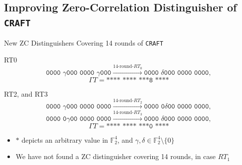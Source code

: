\documentclass{beamer}
\begin{document}
\subsection{Improving Zero-Correlation Distinguisher of \texttt{CRAFT}}
\begin{frame}{New ZC Distinguishers Covering 14 rounds of \texttt{CRAFT}}
\begin{block}{RT0}
\[\texttt{0000~$\gamma$000~0000~$\gamma$000} \xrightarrow{\text{14-round-$RT_0$}} \texttt{0000~$\delta$000~0000~0000},\]
\[\Gamma T = \texttt{****~****~***8~****}\]
\end{block}

\begin{block}{RT2, and RT3}
\[\texttt{0000~$\gamma$000~0000~0000} \xrightarrow{\text{14-round-$RT_2$}} \texttt{0000~0$\delta$00~0000~0000},\]
\[\texttt{0000~0$\gamma$00~0000~0000} \xrightarrow{\text{14-round-$RT_3$}} \texttt{0000~$\delta$000~0000~0000},\]
\[\Gamma T= \texttt{****~****~***0~****}\]
\end{block}
\begin{itemize}
    \item $\texttt{*}$ depicts an arbitrary value in $\mathbb{F}_{2}^{4}$, and $\gamma, \delta\in \mathbb{F}_{2}^{4}\setminus \{0\}$
    \item We have not found a ZC distinguisher covering 14 rounds, in case $RT_{1}$
\end{itemize}
\end{frame}
\end{document}
